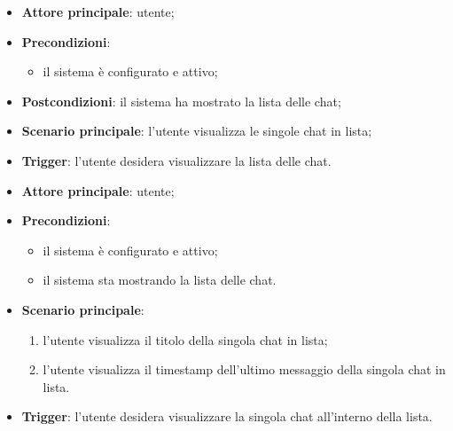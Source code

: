 \documentclass[10pt, a4paper]{article}
\begin{document}
    \begin{itemize}
        \item \textbf{Attore principale}: utente;
        \item \textbf{Precondizioni}:
        \begin{itemize}
            \item il sistema è configurato e attivo;
        \end{itemize}
        \item \textbf{Postcondizioni}: il sistema ha mostrato la lista delle chat;
        \item \textbf{Scenario principale}: l'utente visualizza le singole chat in lista;
        \item \textbf{Trigger}: l’utente desidera visualizzare la lista delle chat.
    \end{itemize}

    \begin{itemize}
        \item \textbf{Attore principale}: utente;
        \item \textbf{Precondizioni}:
            \begin{itemize}
                \item il sistema è configurato e attivo;
                \item il sistema sta mostrando la lista delle chat.
            \end{itemize}
        \item \textbf{Scenario principale}:
        \begin{enumerate}
            \item l'utente visualizza il titolo della singola chat in lista;
            \item l'utente visualizza il timestamp dell'ultimo messaggio della singola chat in lista.
        \end{enumerate}
        \item \textbf{Trigger}: l’utente desidera visualizzare la singola chat all’interno della lista.
    \end{itemize}
\end{document}

